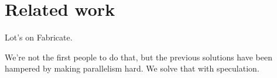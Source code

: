 \section{Related work}
\label{sec:related}

Lot's on Fabricate.

We're not the first people to do that, but the previous solutions have been hampered by making parallelism hard. We solve that with speculation.
